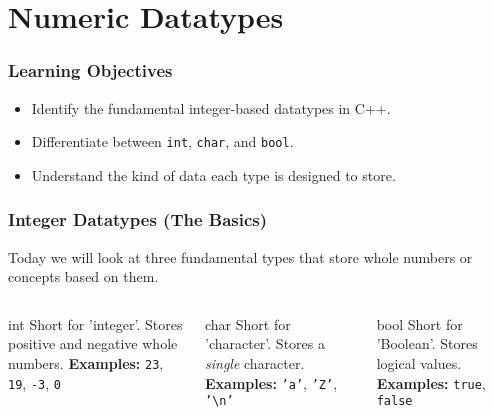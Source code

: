 \documentclass{beamer}
\begin{document}
\section{Numeric Datatypes}

\begin{frame}
\frametitle{Learning Objectives}
\begin{itemize}
    \item Identify the fundamental integer-based datatypes in C++.
    \item Differentiate between \texttt{int}, \texttt{char}, and \texttt{bool}.
    \item Understand the kind of data each type is designed to store.
\end{itemize}
\end{frame}

\begin{frame}
\frametitle{Integer Datatypes (The Basics)}
Today we will look at three fundamental types that store whole numbers or concepts based on them.

\begin{columns}[T]
    \begin{column}{0.33\textwidth}
        \begin{alertblock}{int}
        Short for 'integer'. Stores positive and negative whole numbers.
        \vspace{1em}
        \textbf{Examples:} \texttt{23}, \texttt{19}, \texttt{-3}, \texttt{0}
        \end{alertblock}
    \end{column}
    \begin{column}{0.33\textwidth}
        \begin{exampleblock}{char}
        Short for 'character'. Stores a \textit{single} character.
        \vspace{1em}
        \textbf{Examples:} \texttt{'a'}, \texttt{'Z'}, \texttt{'\textbackslash n'}
        \end{exampleblock}
    \end{column}
    \begin{column}{0.33\textwidth}
        \begin{block}{bool}
        Short for 'Boolean'. Stores logical values.
        \vspace{1em}
        \textbf{Examples:} \texttt{true}, \texttt{false}
        \end{block}
    \end{column}
\end{columns}
\end{frame}
\end{document}
